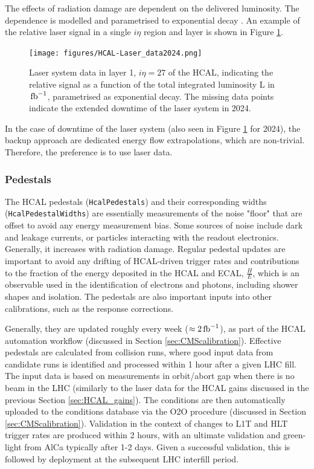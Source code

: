 The effects of radiation damage are dependent on the delivered luminosity. The dependence is modelled and parametrised to exponential decay \cite{CMS-PRF-18-003}. An example of the relative laser signal in a single $i\eta$ region and layer is shown in Figure \ref{fig:HCAL-Laser_data}. 

\begin{figure}[h!]	
\centering
\texttt{[image: figures/HCAL-Laser\_data2024.png]} %
\caption{Laser system data in layer 1, $i\eta = 27$ of the HCAL, indicating the relative signal as a function of the total integrated luminosity L in $\mbox{\ensuremath{\,\text{fb}^{-1}}}$, parametrised as exponential decay. The missing data points indicate the extended downtime of the laser system in 2024.}
\label{fig:HCAL-Laser_data}
\end{figure}

In the case of downtime of the laser system (also seen in Figure \ref{fig:HCAL-Laser_data} for 2024), the backup approach are dedicated energy flow extrapolations, which are non-trivial. Therefore, the preference is to use laser data.

\subsubsection{Pedestals}\label{sec:HCAL_pedestals}
The HCAL pedestals (\texttt{HcalPedestals}) and their corresponding widths (\texttt{HcalPedestalWidths}) are essentially measurements of the noise "floor" that are offset to avoid any energy measurement bias. Some sources of noise include dark and leakage currents, or particles interacting with the readout electronics. Generally, it increases with radiation damage. Regular pedestal updates are important to avoid any drifting of HCAL-driven trigger rates and contributions to the fraction of the energy deposited in the HCAL and ECAL, $\frac{H}{E}$, which is an observable used in the identification of electrons and photons, including shower shapes and isolation. The pedestals are also important inputs into other calibrations, such as the response corrections.

Generally, they are updated roughly every week ($\approx 2 \mbox{\ensuremath{\,\text{fb}^{-1}}}$), as part of the HCAL automation workflow (discussed in Section \ref{sec:CMScalibration}). Effective pedestals are calculated from collision runs, where good input data from candidate runs is identified and processed within 1 hour after a given LHC fill. The input data is based on measurements in orbit/abort gap when there is no beam in the LHC (similarly to the laser data for the HCAL gains discussed in the previous Section \ref{sec:HCAL_gains}). The conditions are then automatically uploaded to the conditions database via the O2O procedure (discussed in Section \ref{sec:CMScalibration}). Validation in the context of changes to L1T and HLT trigger rates are produced within 2 hours, with an ultimate validation and green-light from AlCa typically after 1-2 days. Given a successful validation, this is followed by deployment at the subsequent LHC interfill period.

